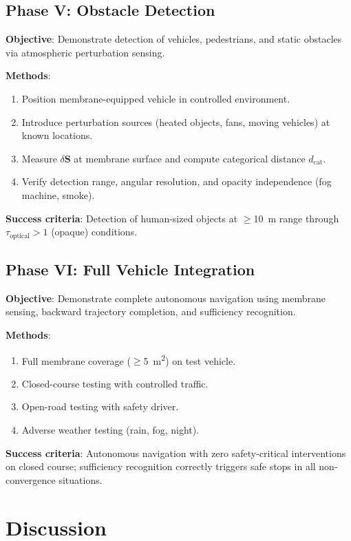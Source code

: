 \documentclass[12pt]{article}
\theoremstyle{definition}
\theoremstyle{remark}
\newcommand{\dcat}{d_{\mathrm{cat}}}
\begin{document}
\subsection{Phase V: Obstacle Detection}

\textbf{Objective}: Demonstrate detection of vehicles, pedestrians, and static obstacles via atmospheric perturbation sensing.

\textbf{Methods}:
\begin{enumerate}[label=\arabic*.]
  \item Position membrane-equipped vehicle in controlled environment.
  \item Introduce perturbation sources (heated objects, fans, moving vehicles) at known locations.
  \item Measure $\delta\mathbf{S}$ at membrane surface and compute categorical distance $\dcat$.
  \item Verify detection range, angular resolution, and opacity independence (fog machine, smoke).
\end{enumerate}

\textbf{Success criteria}: Detection of human-sized objects at $\geq$\SI{10}{m} range through $\tau_{\mathrm{optical}} > 1$ (opaque) conditions.

\subsection{Phase VI: Full Vehicle Integration}

\textbf{Objective}: Demonstrate complete autonomous navigation using membrane sensing, backward trajectory completion, and sufficiency recognition.

\textbf{Methods}:
\begin{enumerate}[label=\arabic*.]
  \item Full membrane coverage ($\geq$\SI{5}{m^2}) on test vehicle.
  \item Closed-course testing with controlled traffic.
  \item Open-road testing with safety driver.
  \item Adverse weather testing (rain, fog, night).
\end{enumerate}

\textbf{Success criteria}: Autonomous navigation with zero safety-critical interventions on closed course; sufficiency recognition correctly triggers safe stops in all non-convergence situations.


\section{Discussion}
\label{sec:discussion}
\end{document}
